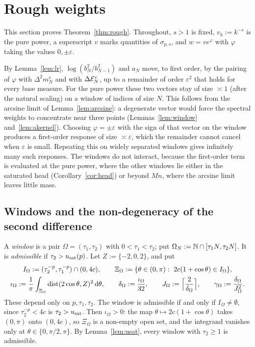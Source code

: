 \section{Rough weights}\label{sec:rough}

This section proves Theorem~\ref{thm:rough}. Throughout, $s>1$ is fixed, $v_k:=k^{-s}$ is the pure power, a
superscript $v$ marks quantities of $\sigma_{p,s}$, and $w=ve^\varphi$ with $\varphi$ taking the values $0,\pm\varepsilon$.

By Lemma~\ref{lem:lr}, $\log(b_N^2/b_{N-1}^2)$ and $a_N$ move, to first order, by
the pairing of $\varphi$ with $\Delta^2m_N^v$ and with $\Delta\mathcal{E}_N^v$, up to a remainder of order $\varepsilon^2$ that holds
for every base measure. For the pure power these two vectors stay of size $\asymp1$ (after the natural scaling) on a
window of indices of size $N$. This follows from the arcsine limit of Lemma~\ref{lem:arcsine}: a
degenerate vector would force the spectral weights to concentrate near three points
(Lemmas~\ref{lem:window} and~\ref{lem:akernel}). Choosing $\varphi=\pm\varepsilon$ with the sign of that vector on the
window produces a first-order response of size $\asymp\varepsilon$, which the remainder cannot cancel when
$\varepsilon$ is small. Repeating this on widely separated windows gives infinitely many such responses. The
windows do not interact, because the first-order term is evaluated at the pure power, where the other windows lie either in
the saturated head (Corollary~\ref{cor:head}) or beyond $Mn$, where the arcsine limit leaves little mass.

\subsection{Windows and the non-degeneracy of the second difference}\label{sec:window}
A \emph{window} is a pair $\Omega=(\tau_1,\tau_2)$ with $0<\tau_1<\tau_2$; put $\Omega_N:=\mathbb{N}\cap[\tau_1N,\tau_2N]$. It is
\emph{admissible} if $\tau_2>u_{\mathrm{sat}}(p)$. Let $Z:=\{-2,0,2\}$, and put
\begin{equation}\label{eq:window-constants}
\begin{gathered}
  I_\Omega:=(\tau_2^{-p},\tau_1^{-p})\cap(0,4c),\qquad \Xi_\Omega:=\{\theta\in(0,\pi):\ 2c(1+\cos\theta)\in I_\Omega\},\\
  \iota_\Omega:=\frac1\pi\int_{\Xi_\Omega}\operatorname{dist}(2\cos\theta,Z)^2\,\mathrm{d}\theta,\qquad \delta_\Omega:=\frac{\iota_\Omega}{32},\qquad
  J_\Omega:=\Bigl\lceil\frac2{\delta_\Omega}\Bigr\rceil,\qquad \gamma_\Omega:=\frac{\delta_\Omega}{J_\Omega^2}.
\end{gathered}
\end{equation}
These depend only on $p,\tau_1,\tau_2$. The window is admissible if and only if $I_\Omega\ne\emptyset$, since
$\tau_2^{-p}<4c$ is $\tau_2>u_{\mathrm{sat}}$. Then $\iota_\Omega>0$: the map $\theta\mapsto2c(1+\cos\theta)$ takes $(0,\pi)$ onto
$(0,4c)$, so $\Xi_\Omega$ is a non-empty open set, and the integrand vanishes only at $\theta\in\{0,\pi/2,\pi\}$. By
Lemma~\ref{lem:usat}, every window with $\tau_2\ge1$ is admissible.

